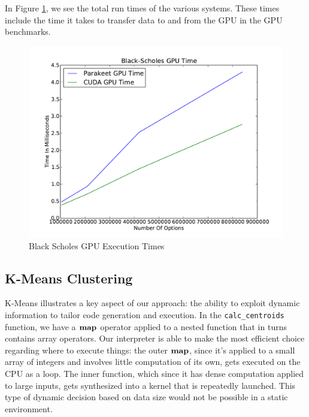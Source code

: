 \documentclass[preprint]{sigplanconf}
\begin{document}
In Figure \ref{BSResults}, we see the total run times of the various systems. These times include the time it takes to transfer data to and from the GPU in the GPU benchmarks.  

\begin{figure}
\includegraphics[scale=0.45]{BSGPU.pdf}
\caption{Black Scholes GPU Execution Times}
\label{BSResults}
\end{figure}

\subsection{K-Means Clustering}
\label{results-k-means}

K-Means illustrates a key aspect of our approach: the ability to exploit dynamic information to tailor code generation and execution.  In the \texttt{calc\_centroids} function, we have a $\mbox{\textbf{map}}$ operator applied to a
nested function that in turns contains array operators.  Our interpreter is able to make the most efficient choice regarding where to execute things: the outer $\mbox{\textbf{map}}$, since it's applied to a small array of integers and involves little computation of its own, gets executed on the CPU as a loop.  The inner function, which since it has dense computation applied to large inputs, gets synthesized into a kernel that is repeatedly launched.  This type of dynamic decision based on data size would not be possible in a static environment.
\end{document}
